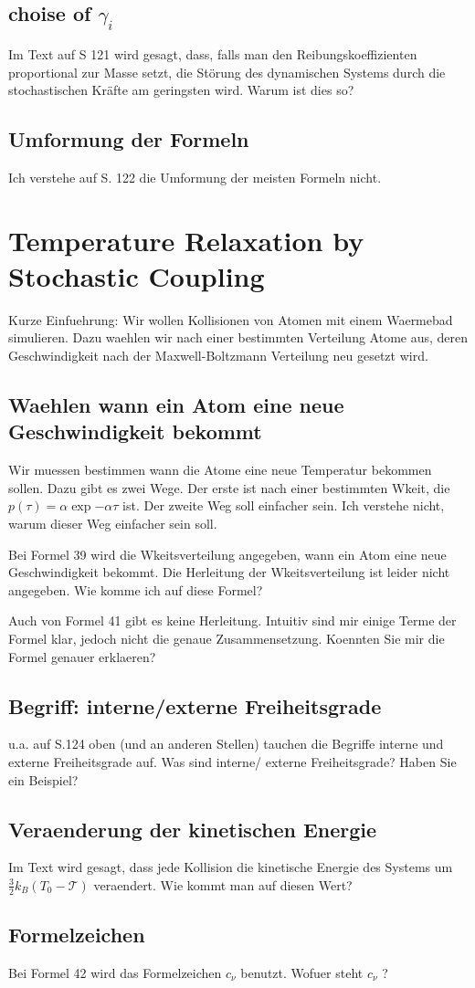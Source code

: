 \documentclass[]{article}
\begin{document}
\subsection{choise of $\gamma_i$}
Im Text auf S 121 wird gesagt, dass, falls man den Reibungskoeffizienten proportional zur Masse setzt, die Störung des dynamischen Systems durch die stochastischen Kräfte am geringsten wird. Warum ist dies so?  

\subsection{Umformung der Formeln}
Ich verstehe auf S. 122 die Umformung der meisten Formeln nicht. 


\section{Temperature Relaxation by Stochastic Coupling}

Kurze Einfuehrung: Wir wollen Kollisionen von Atomen mit einem Waermebad simulieren.
Dazu waehlen wir nach einer bestimmten Verteilung Atome aus, deren Geschwindigkeit nach der Maxwell-Boltzmann Verteilung neu gesetzt wird. 

\subsection{Waehlen wann ein Atom eine neue Geschwindigkeit bekommt}
Wir muessen bestimmen wann die Atome eine neue Temperatur bekommen sollen. Dazu gibt es zwei Wege. Der erste ist nach einer bestimmten Wkeit, die $p(\tau)= \alpha \exp{- \alpha \tau}$ ist. Der zweite Weg soll einfacher sein. Ich verstehe nicht, warum dieser Weg einfacher sein soll. 

Bei Formel 39 wird die Wkeitsverteilung angegeben, wann ein Atom eine neue Geschwindigkeit bekommt. Die Herleitung der Wkeitsverteilung ist leider nicht angegeben. Wie komme ich auf diese Formel? 

Auch von Formel 41 gibt es keine Herleitung. Intuitiv sind mir einige Terme der Formel klar, jedoch nicht die genaue Zusammensetzung. Koennten Sie mir die Formel genauer erklaeren? 

\subsection{Begriff: interne/externe Freiheitsgrade}
u.a. auf S.124 oben (und an anderen Stellen) tauchen die Begriffe interne und externe Freiheitsgrade auf. Was sind interne/ externe Freiheitsgrade? Haben Sie ein Beispiel?  

\subsection{Veraenderung der kinetischen Energie}
Im Text wird gesagt, dass jede Kollision die kinetische Energie des Systems um $\frac{3}{2} k_B (T_0-\mathcal{T})$ veraendert. Wie kommt man auf diesen Wert? 

\subsection{Formelzeichen}
Bei Formel 42 wird das Formelzeichen $c_{\nu}$ benutzt. Wofuer steht $c_{\nu}$ ?
\end{document}
